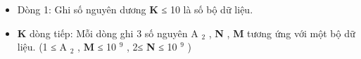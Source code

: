 \begin{itemize}
	\item Dòng 1: Ghi số nguyên dương \textbf{ K } ≤ 10 là số bộ dữ liệu.
	\item \textbf{K } dòng tiếp: Mỗi dòng ghi 3 số nguyên A $_ 2 $ , \textbf{ N } , \textbf{ M } tương ứng với một bộ dữ liệu. (1 ≤ A $_ 2 $ , \textbf{ M } ≤ 10 $^ 9 $ , 2≤ \textbf{ N } ≤ 10 $^ 9 $ )
\end{itemize}

\